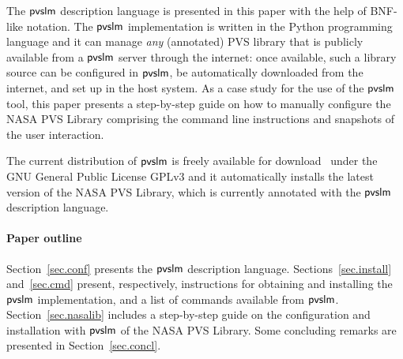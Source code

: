 The $\textsf{pvslm}$ description language is presented in this paper with the
help of BNF-like notation. The $\textsf{pvslm}$ implementation is written in
the Python programming language and it can manage {\em any}
(annotated) PVS library that is publicly available from a $\textsf{pvslm}$
server through the internet: once available, such a library source can
be configured in $\textsf{pvslm}$, be automatically downloaded from the
internet, and set up in the host system. As a case study for the use
of the $\textsf{pvslm}$ tool, this paper presents a step-by-step guide on how
to manually configure the NASA PVS Library comprising the command line
instructions and snapshots of the user interaction.

The current distribution of $\textsf{pvslm}$ is freely available for
download~\cite{pvslm} under the GNU General Public License GPLv3 and
it automatically installs the latest version of the NASA PVS Library,
which is currently annotated with the $\textsf{pvslm}$ description language.

\paragraph{Paper outline} Section~\ref{sec.conf} presents the $\textsf{pvslm}$ 
description language. Sections~\ref{sec.install} and~\ref{sec.cmd} 
present, respectively, instructions for obtaining and installing the $\textsf{pvslm}$ 
implementation, and a list of commands available from $\textsf{pvslm}$. 
Section~\ref{sec.nasalib} includes a step-by-step guide on the configuration and
installation with $\textsf{pvslm}$ of the NASA PVS Library. Some concluding
remarks are presented in Section~\ref{sec.concl}.
